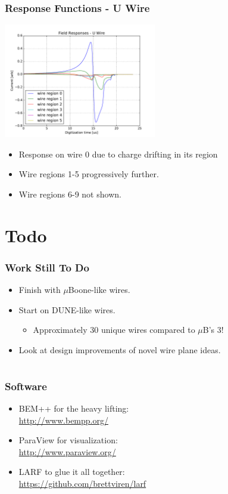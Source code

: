 \documentclass[xcolor=dvipsnames]{beamer}
\begin{document}
\begin{frame}
  \frametitle{Response Functions - U Wire}
  \begin{center}
    \includegraphics[height=5cm,clip,trim=0 0cm 0 0cm]{current-responses.pdf}
  \end{center}
  \begin{itemize}
  \item Response on wire 0 due to charge drifting in its region
  \item Wire regions 1-5 progressively further.
  \item Wire regions 6-9 not shown.
  \end{itemize}
\end{frame}

\section{Todo}

\begin{frame}
  \frametitle{Work Still To Do}
  \begin{itemize}
  \item Finish with $\mu$Boone-like wires.
  \item Start on DUNE-like wires.
    \begin{itemize}
    \item Approximately 30 unique wires compared to $\mu$B's 3!
    \end{itemize}
  \item Look at design improvements of novel wire plane ideas.
  \end{itemize}
\end{frame}

\section{}
\begin{frame}
  \frametitle{Software}
  \begin{itemize}
  \item BEM++ for the heavy lifting: \\
    \url{http://www.bempp.org/}
  \item ParaView for visualization: \\
    \url{http://www.paraview.org/}
  \item LARF to glue it all together: \\
    \url{https://github.com/brettviren/larf}
  \end{itemize}
  
\end{frame}
\end{document}
